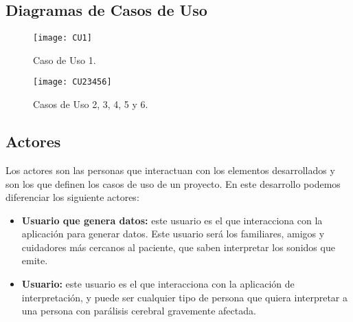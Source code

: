 \subsection{Diagramas de Casos de Uso}
\begin{figure}[H]
	\centering
	\texttt{[image: CU1]}
	\caption{Caso de Uso 1.}
	\label{fig:cu1}
\end{figure}

\begin{figure}[H]
	\centering
	\texttt{[image: CU23456]}
	\caption{Casos de Uso 2, 3, 4, 5 y 6.}
	\label{fig:cu}
\end{figure}

\subsection{Actores}
Los actores son las personas que interactuan con los elementos desarrollados y son los que definen los casos de uso de un proyecto. En este desarrollo podemos diferenciar los siguiente actores:
\begin{itemize}
	\item \textbf{Usuario que genera datos:} este usuario es el que interacciona con la aplicación para generar datos. Este usuario será los familiares, amigos y cuidadores más cercanos al paciente, que saben interpretar los sonidos que emite.
	\item \textbf{Usuario:} este usuario es el que interacciona con la aplicación de interpretación, y puede ser cualquier tipo de persona que quiera interpretar a una persona con parálisis cerebral gravemente afectada.
\end{itemize}
